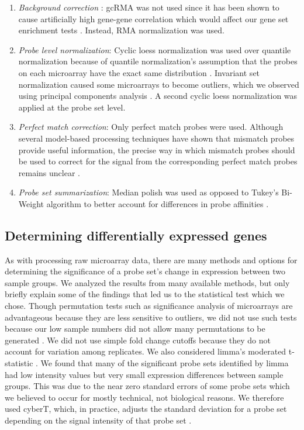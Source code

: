 \begin{enumerate}
  \item \emph{Background correction} \cite{Irizarry:2003ge}: 
  gcRMA\cite{Wu:2004wh} was not used since it
  has been shown to cause artificially high gene-gene correlation which
  would affect our gene set enrichment tests \cite{Lim:2007gc}. Instead,
  RMA normalization was used.
  
  \item \emph{Probe level normalization}: Cyclic loess normalization was 
  used over quantile normalization because of quantile normalization's assumption
  that the probes on each microarray have the exact same 
  distribution \cite{Ballman:2004ee}. Invariant
  set normalization caused some microarrays to become outliers, which we observed
  using principal components analysis \cite{Li:2001wk}. A second cyclic loess normalization was applied
  at the probe set level.
  
  \item \emph{Perfect match correction}: Only perfect match probes were used.
  Although several model-based processing techniques have shown that mismatch
  probes provide useful information, the precise way in which mismatch probes should
  be used to correct for the signal from the corresponding perfect match 
  probes remains unclear \cite{Wang:2007dy}.
  
  \item \emph{Probe set summarization}: Median polish was 
  used as opposed to Tukey's Bi-Weight algorithm to better account for 
  differences in probe affinities \cite{Tukey:1977uy, Affymetrix:2002vh}.
    
\end{enumerate}

\subsection{Determining differentially expressed genes}\label{S:DE}

As with processing raw microarray data, there are many methods and options
for determining the significance of a probe set's change in expression between
two sample groups. We analyzed the results from many available methods, but only
briefly explain some of the findings that led us to the statistical test 
which we chose. Though permutation tests such as significance analysis of
microarrays are advantageous because they are less sensitive to outliers,
we did not use such tests because our low sample numbers did not allow
many permutations to be generated \cite{Tusher:2001kk}. We did not use 
simple fold change cutoffs because
they do not account for variation among replicates. We also considered limma's 
moderated t-statistic \cite{Smyth:2004gh}. We found
that many of the significant probe sets identified by limma had low intensity values but very
small expression differences between sample groups. This was due to the near zero standard 
errors of some probe sets which we believed to occur for mostly technical,
not biological reasons. We therefore used cyberT, which, in practice,
adjusts the standard deviation for a probe set depending on the signal intensity
of that probe set \cite{Baldi:2001ul}.

